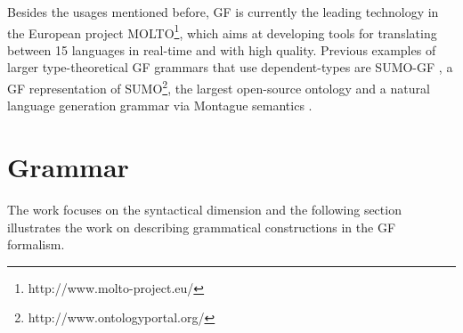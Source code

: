 \documentclass[runningheads,a4paper]{llncs}
\begin{document}
Besides the usages mentioned before, GF is currently the leading technology in the European project
MOLTO\footnote{http://www.molto-project.eu/},
which aims at developing
tools for translating between 15 languages in real-time and with high quality. 
Previous examples of larger type-theoretical GF grammars that use 
dependent-types are SUMO-GF \cite{ontologies2},
a GF representation of SUMO\footnote{http://www.ontologyportal.org/}, the largest open-source ontology
and  a natural language generation grammar via Montague semantics \cite{montague}.



\section{Grammar}

The work focuses on the syntactical dimension and the following section
illustrates the work on describing grammatical constructions in the GF 
formalism.\\
\end{document}
